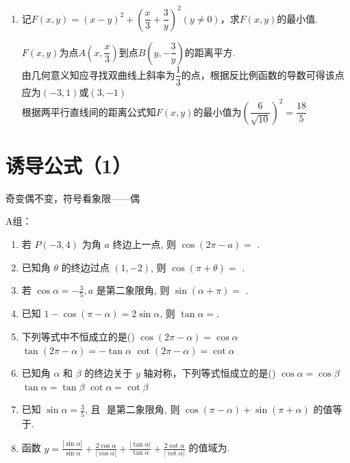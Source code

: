 \begin{enumerate}
    \begin{jieda}
        $x^2+y^2+\dfrac{16}{x} + \dfrac{1}{4y} = \dfrac{27}{4} + P$ \\
        $\dfrac{27}{4} + P \geq \sqrt[3]{x^2 \cdot \dfrac{8}{x} \cdot \dfrac{8}{x}} + \sqrt[3]{y^2 \cdot \dfrac{1}{8y} \cdot \dfrac{1}{8y}} = 4 + \dfrac{1}{4} = \dfrac{25}{4}$
    \end{jieda}
    \item 记$F(x, y) = (x-y)^2+(\dfrac{x}{3} + \dfrac{3}{y})^2(y \neq 0)$，求$F(x, y)$的最小值.
    \begin{jieda}
        $F(x, y)$为点$A(x, \dfrac{x}{3})$到点$B(y, -\dfrac{3}{y})$的距离平方. \\
        由几何意义知应寻找双曲线上斜率为$\dfrac{1}{3}$的点，根据反比例函数的导数可得该点应为$(-3, 1)$或$(3, -1)$ \\
        根据两平行直线间的距离公式知$F(x, y)$的最小值为$(\dfrac{6}{\sqrt{10}})^2 = \dfrac{18}{5}$
    \end{jieda}
\end{enumerate}



\section{诱导公式（1）}
\zsd 奇变偶不变，符号看象限——偶

A组：
\begin{enumerate}
\item 若 $P(-3,4)$ 为角 $a$ 终边上一点, 则 $\cos (2 \pi-a)=$ .
\item 已知角 $\theta$ 的终边过点 $(1,-2)$, 则 $\cos (\pi+\theta)=$ .
\item 若 $\cos \alpha=-\frac{3}{5}, a$ 是第二象限角, 则 $\sin (\alpha+\pi)=$ .
\item 已知 $1-\cos (\pi-\alpha)=2 \sin \alpha$, 则 $\tan \alpha=$.
\item 下列等式中不恒成立的是\dotfill()
\xx{$\sin (2 \pi-\alpha)=-\sin \alpha$}
{$\cos (2 \pi-\alpha)=\cos \alpha$}
{$\tan (2 \pi-\alpha)=-\tan \alpha$}
{$\cot (2 \pi-\alpha)=\cot \alpha$}

\item 已知角 $\alpha$ 和 $\beta$ 的终边关于 $y$ 轴对称，下列等式恒成立的是\dotfill()
\xx{$\sin \alpha=\sin \beta$}
{$\cos \alpha=\cos \beta$}
{$\tan \alpha=\tan \beta$}
{$\cot \alpha=\cot \beta$}

\item 已知 $\sin \alpha=\frac{3}{5}$, 且 $\textbf{}$ 是第二象限角, 则 $\cos (\pi-\alpha)+\sin (\pi+\alpha)$ 的值等于.

\item 函数 $y=\frac{|\sin \alpha|}{\sin \alpha}+\frac{2 \cos \alpha}{|\cos \alpha|}+\frac{|\tan \alpha|}{\tan \alpha}+\frac{2 \cot \alpha}{|\cot \alpha|}$ 的值域为.


\end{enumerate}

